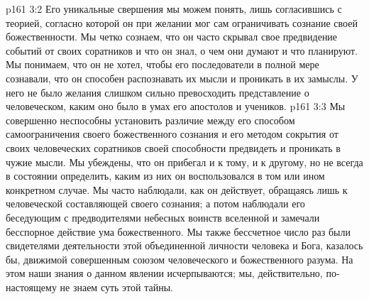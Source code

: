 \vs p161 3:2 Его уникальные свершения мы можем понять, лишь согласившись с теорией, согласно которой он при желании мог сам ограничивать сознание своей божественности. Мы четко сознаем, что он часто скрывал свое предвидение событий от своих соратников и что он знал, о чем они думают и что планируют. Мы понимаем, что он не хотел, чтобы его последователи в полной мере сознавали, что он способен распознавать их мысли и проникать в их замыслы. У него не было желания слишком сильно превосходить представление о человеческом, каким оно было в умах его апостолов и учеников.
\vs p161 3:3 Мы совершенно неспособны установить различие между его способом самоограничения своего божественного сознания и его методом сокрытия от своих человеческих соратников своей способности предвидеть и проникать в чужие мысли. Мы убеждены, что он прибегал и к тому, и к другому, но не всегда в состоянии определить, каким из них он воспользовался в том или ином конкретном случае. Мы часто наблюдали, как он действует, обращаясь лишь к человеческой составляющей своего сознания; а потом наблюдали его беседующим с предводителями небесных воинств вселенной и замечали бесспорное действие ума божественного. Мы также бессчетное число раз были свидетелями деятельности этой объединенной личности человека и Бога, казалось бы, движимой совершенным союзом человеческого и божественного разума. На этом наши знания о данном явлении исчерпываются; мы, действительно, по\hyp{}настоящему не знаем суть этой тайны.
